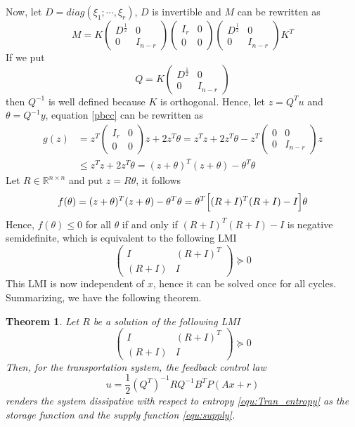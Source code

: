 \documentclass[trsc,nonblindrev]{informs3} %
\renewcommand{\vec}[1]{#1}
\newcommand{\mat}[1]{#1}
\newtheorem{thm}{Theorem}
\begin{document}
Now, let $D =diag(\xi_1;\cdots,\xi_r)$, $D$ is invertible  and $M$ can be rewritten as
$$M=K\left(\begin{array}{cc}D^{\frac{1}{2}}& 0 \\ 0 &I_{n-r} 
\end{array}\right)
\left(\begin{array}{cc}I_r& 0 \\ 0 &0 
\end{array}\right)
\left(\begin{array}{cc}D^{\frac{1}{2}}& 0 \\ 0 &I_{n-r} 
\end{array}\right)
K^T$$
If we put 
$$Q=K\left(\begin{array}{cc}D^{\frac{1}{2}}& 0 \\ 0 &I_{n-r} 
\end{array}\right)$$
then $Q^{-1}$ is well defined because $K$ is orthogonal. Hence, let $z=Q^T u$  and $\theta= Q^{-1}y$, equation \eqref{pbcc} can be rewritten as
\begin{align}\label{pbc1}
g(z)&=z^T\left(\begin{array}{cc}I_r& 0 \\ 0 &0 
\end{array}\right)z+2z^T\theta=z^T z +2z^T \theta -z^T\left(\begin{array}{cc}0& 0 \\ 0 &I_{n-r} 
\end{array}\right) z\nonumber\\
&\leq z^T z +2z^T \theta=(z+\theta)^T (z+\theta) -\theta^T \theta
\end{align}
Let $R\in\mathbb{R}^{n\times n}$ and put
$z=R\theta$, it follows
\begin{equation}\label{pbc2}
f(\theta)=(z+\theta)^T (z+\theta) -\theta^T \theta=\theta^T\Bigl[(R+I)^T(R+I)-I\Bigr]\theta
\end{equation}
Hence, $f(\theta)\leq 0$ for all $\theta$  if and only if
$(R+I)^T(R+I)-I$  is negative semidefinite, which is equivalent to 
  the following LMI 
$$\begin{pmatrix}
\mat{I}& (\mat{R}+\mat{I})^T  \\
 (\mat{R}+\mat{I})  & \mat{I}
\end{pmatrix}\succeq 0$$
This LMI is now independent of $\vec{x}$, hence it can be solved once for all cycles. Summarizing, we have the following theorem. 

\begin{thm}\label{thm:pbc2} Let $R$  be a solution of the
following LMI
$$\begin{pmatrix}
\mat{I}& (\mat{R}+\mat{I})^T  \\
 (\mat{R}+\mat{I})  & \mat{I}
\end{pmatrix}\succeq 0$$
Then, for the transportation system, the feedback control law
\begin{equation}
\label{equ:feedback2}
\vec{u}=\frac{1}{2}(\mat{Q}^T)^{-1}\mat{R}\mat{Q}^{-1}\mat{B}^T\mat{P}(\mat{A}
\vec{x}+\vec{r})
\end{equation}
renders the system dissipative with respect to
entropy \eqref{equ:Tran_entropy} as the storage function and the
supply function \eqref{equ:supply}.\end{thm}
\end{document}
